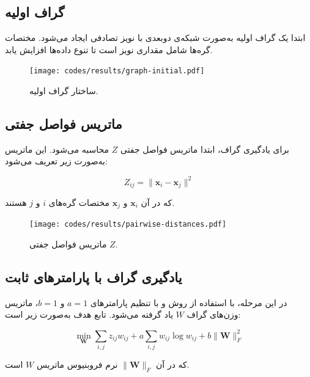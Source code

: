 \documentclass[10pt,twocolumn,a4paper]{article}
\begin{document}
	\subsection{گراف اولیه}
	ابتدا یک گراف اولیه به‌صورت شبکه‌ی دوبعدی با نویز تصادفی ایجاد می‌شود. مختصات گره‌ها شامل مقداری نویز است تا تنوع داده‌ها افزایش یابد.
	
	\begin{latin}
		
	\end{latin}
	
	\begin{figure}[H]
		\centering
		\texttt{[image: codes/results/graph-initial.pdf]}
		\caption{ساختار گراف اولیه.}
		\label{fig:graph-initial}
	\end{figure}
	
	\subsection{ماتریس فواصل جفتی}
	برای یادگیری گراف، ابتدا ماتریس فواصل جفتی \( Z \) محاسبه می‌شود. این ماتریس به‌صورت زیر تعریف می‌شود:
	
	\[
	Z_{ij} = \|\mathbf{x}_i - \mathbf{x}_j\|^2
	\]
	
	که در آن \( \mathbf{x}_i \) و \( \mathbf{x}_j \) مختصات گره‌های \( i \) و \( j \) هستند.
	
	\begin{latin}
		
	\end{latin}
	
	
	\begin{figure}[H]
		\centering
		\texttt{[image: codes/results/pairwise-distances.pdf]}
		\caption{ماتریس فواصل جفتی \( Z \).}
		\label{fig:pairwise-distances}
	\end{figure}
	
	\subsection{یادگیری گراف با پارامترهای ثابت}
	در این مرحله، با استفاده از روش \cite{Kalofolias2016} و با تنظیم پارامترهای \( a = 1 \) و \( b = 1 \)، ماتریس وزن‌های گراف \( W \) یاد گرفته می‌شود. تابع هدف به‌صورت زیر است:
	
	\[
	\min_{\bm{W}} \sum_{i,j} z_{ij} w_{ij} + a \sum_{i,j} {w}_{ij} \log {w}_{ij} + b \|\bm{W}\|_F^2
	\]
	
	که در آن
	 \( \|\bm{W}\|_F \)
	 نرم فروبنیوس ماتریس \( W \) است.
	
\end{document}
